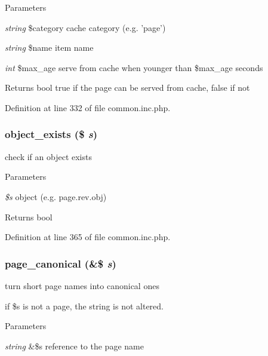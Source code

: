 \begin{DoxyParams}{Parameters}
\item[{\em string}]\$category cache category (e.g. 'page') \item[{\em string}]\$name item name \item[{\em int}]\$max\_\-age serve from cache when younger than \$max\_\-age seconds \end{DoxyParams}
\begin{DoxyReturn}{Returns}
bool true if the page can be served from cache, false if not 
\end{DoxyReturn}


Definition at line 332 of file common.inc.php.

\hypertarget{common_8inc_8php_a3d71a269e01b98748fb57719feef27be}{
\subsubsection[{object\_\-exists}]{\setlength{\rightskip}{0pt plus 5cm}object\_\-exists (\$ {\em s})}}
\label{common_8inc_8php_a3d71a269e01b98748fb57719feef27be}
check if an object exists


\begin{DoxyParams}{Parameters}
\item[{\em \$s}]object (e.g. page.rev.obj) \end{DoxyParams}
\begin{DoxyReturn}{Returns}
bool 
\end{DoxyReturn}


Definition at line 365 of file common.inc.php.

\hypertarget{common_8inc_8php_a31ed04b0c90ac3077e71743c307d45f8}{
\subsubsection[{page\_\-canonical}]{\setlength{\rightskip}{0pt plus 5cm}page\_\-canonical (\&\$ {\em s})}}
\label{common_8inc_8php_a31ed04b0c90ac3077e71743c307d45f8}
turn short page names into canonical ones

if \$s is not a page, the string is not altered. 
\begin{DoxyParams}{Parameters}
\item[{\em string}]\&\$s reference to the page name \end{DoxyParams}


